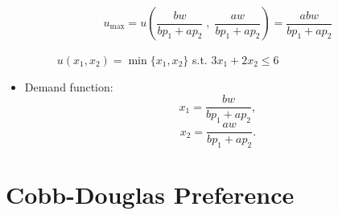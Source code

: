 \documentclass[
12pt, %
a4paper, %
onecolumn, %
portrait %
]{article}
\begin{document}
\begin{itemize}
	\[
	u_{\max}=u\left(\frac{bw}{bp_1+ap_2}\;,\;\frac{aw}{bp_1+ap_2}\right)=\frac{abw}{bp_1+ap_2}
	\]
	\begin{figure}[H]
		\centering
		\caption{$u(x_1,x_2)=\min\{x_1,x_2\}$ s.t. $3x_1+2x_2\le 6$}
		\label{Fig.lable}
	\end{figure}
	
	
	
	\item Demand function:
	\[
	x_1=\frac{bw}{bp_1+ap_2},
	\]
	\[
	x_2=\frac{aw}{bp_1+ap_2}.
	\]
	
\end{itemize}





\section{Cobb-Douglas Preference}
\end{document}
